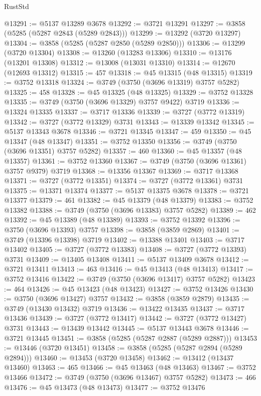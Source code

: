 \begin{lexlean}{RustStd}
\begin{coremodule}
@13291 := @5137 @13289 @3678
@13292 := @3721 @13291
@13297 := @3858 (@5285 (@5287 @2843 (@5289 @2843)))
@13299 := @13292 (@3720 @13297)
@13304 := @3858 (@5285 (@5287 @2850 (@5289 @2850)))
@13306 := @13299 (@3720 @13304)
@13308 := @13260 (@13283 @13306)
@13310 := @13176 (@13201 @13308)
@13312 := @13008 (@13031 @13310)
@13314 := @12670 (@12693 @13312)
@13315 := 457
@13318 := @45 @13315 (@48 @13315)
@13319 := @3752 @13318
@13324 := @3749 (@3750 (@3696 @13319) @3757 @5282)
@13325 := 458
@13328 := @45 @13325 (@48 @13325)
@13329 := @3752 @13328
@13335 := @3749 (@3750 (@3696 @13329) @3757 @9422) @3719
@13336 := @13324 @13335
@13337 := @3717 @13336
@13339 := @3727 (@3772 @13319)
@13342 := @3727 (@3772 @13329) @3731
@13343 := @13339 @13342
@13345 := @5137 @13343 @3678
@13346 := @3721 @13345
@13347 := 459
@13350 := @45 @13347 (@48 @13347)
@13351 := @3752 @13350
@13356 := @3749 (@3750 (@3696 @13351) @3757 @5282)
@13357 := 460
@13360 := @45 @13357 (@48 @13357)
@13361 := @3752 @13360
@13367 := @3749 (@3750 (@3696 @13361) @3757 @9379) @3719
@13368 := @13356 @13367
@13369 := @3717 @13368
@13371 := @3727 (@3772 @13351)
@13374 := @3727 (@3772 @13361) @3731
@13375 := @13371 @13374
@13377 := @5137 @13375 @3678
@13378 := @3721 @13377
@13379 := 461
@13382 := @45 @13379 (@48 @13379)
@13383 := @3752 @13382
@13388 := @3749 (@3750 (@3696 @13383) @3757 @5282)
@13389 := 462
@13392 := @45 @13389 (@48 @13389)
@13393 := @3752 @13392
@13396 := @3750 (@3696 @13393) @3757
@13398 := @3858 (@3859 @2869)
@13401 := @3749 (@13396 @13398) @3719
@13402 := @13388 @13401
@13403 := @3717 @13402
@13405 := @3727 (@3772 @13383)
@13408 := @3727 (@3772 @13393) @3731
@13409 := @13405 @13408
@13411 := @5137 @13409 @3678
@13412 := @3721 @13411
@13413 := 463
@13416 := @45 @13413 (@48 @13413)
@13417 := @3752 @13416
@13422 := @3749 (@3750 (@3696 @13417) @3757 @5282)
@13423 := 464
@13426 := @45 @13423 (@48 @13423)
@13427 := @3752 @13426
@13430 := @3750 (@3696 @13427) @3757
@13432 := @3858 (@3859 @2879)
@13435 := @3749 (@13430 @13432) @3719
@13436 := @13422 @13435
@13437 := @3717 @13436
@13439 := @3727 (@3772 @13417)
@13442 := @3727 (@3772 @13427) @3731
@13443 := @13439 @13442
@13445 := @5137 @13443 @3678
@13446 := @3721 @13445
@13451 := @3858 (@5285 (@5287 @2887 (@5289 @2887)))
@13453 := @13446 (@3720 @13451)
@13458 := @3858 (@5285 (@5287 @2894 (@5289 @2894)))
@13460 := @13453 (@3720 @13458)
@13462 := @13412 (@13437 @13460)
@13463 := 465
@13466 := @45 @13463 (@48 @13463)
@13467 := @3752 @13466
@13472 := @3749 (@3750 (@3696 @13467) @3757 @5282)
@13473 := 466
@13476 := @45 @13473 (@48 @13473)
@13477 := @3752 @13476

\end{coremodule}
\end{lexlean}
